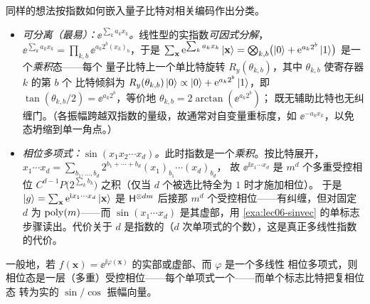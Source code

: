 \begin{remark}[可分离与相位多项式的变体]
\label{rem:lec06-phasepoly}
同样的想法按指数如何嵌入量子比特对相关编码作出分类。
\begin{itemize}[leftmargin=1.4em,nosep]
  \item \emph{可分离（最易）：$\ee^{\sum_k a_k x_k}$。}线性型的实指数\emph{可因式分解}，
        $\ee^{\sum_k a_k x_k}=\prod_{k,b}\ee^{a_k 2^b (x_k)_b}$，于是
        $\sum_{\mathbf x}\mathrm{e}^{\sum_k a_k x_k}\ket{\mathbf x}
        =\bigotimes_{k,b}\bigl(\ket0+\mathrm{e}^{a_k 2^b}\ket1\bigr)$ 是一个\emph{乘积}态——每个
        量子比特上一个单比特旋转 $R_y(\theta_{k,b})$，其中 $\theta_{k,b}$ 使寄存器 $k$ 的第 $b$ 个
        比特倾斜为 $R_y(\theta_{k,b})\ket0\propto\ket0+\mathrm{e}^{a_k 2^b}\ket1$，即
        $\tan(\theta_{k,b}/2)=\ee^{a_k 2^b}$，等价地 $\theta_{k,b}=2\arctan(\ee^{a_k 2^b})$；
        既无辅助比特也无纠缠门。（各振幅跨越双指数的量级，故通常对自变量重标度，如 $\ee^{-a_k x_k}$，以免
        态坍缩到单一角点。）
  \item \emph{相位多项式：$\sin(x_1x_2\cdots x_d)$。}此时指数是一个\emph{乘积}。按比特展开，
        $x_1\cdots x_d=\sum_{b_1,\dots,b_d}2^{b_1+\cdots+b_d}(x_1)_{b_1}\cdots(x_d)_{b_d}$，
        故 $\ee^{\ii x_1\cdots x_d}$ 是 $m^d$ 个多重受控相位
        $C^{d-1}P\bigl(2^{\sum_k b_k}\bigr)$ 之积（仅当 $d$ 个被选比特全为 $1$ 时才施加相位）。
        于是 $\ket g=\sum_{\mathbf x}\mathrm{e}^{\mathrm{i} x_1\cdots x_d}\ket{\mathbf x}$ 是
        $\mathsf{H}^{\otimes dm}$ 后接那 $m^d$ 个受控相位——有纠缠，但对固定 $d$ 为 $\operatorname{poly}(m)$——而
        $\sin(x_1\cdots x_d)$ 是其虚部，用 \cref{exa:lec06-sinvec} 的单标志步骤读出。代价关于
        $d$ 是指数的（$d$ 次单项式的个数），这是真正多线性指数的代价。
\end{itemize}
一般地，若 $f(\mathbf x)=\ee^{\ii\varphi(\mathbf x)}$ 的实部或虚部、而 $\varphi$ 是一个多线性
相位多项式，则相位态是一层（多重）受控相位——每个单项式一个——而单个标志比特把复相位态
转为实的 $\sin/\cos$ 振幅向量。
\end{remark}

